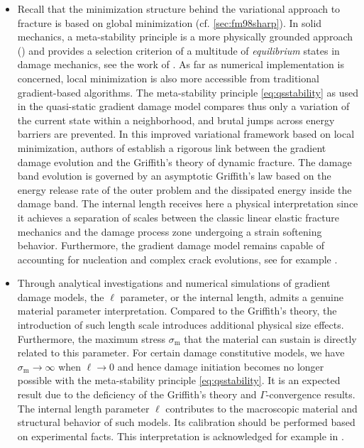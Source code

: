 \begin{itemize}
\item Recall that the minimization structure behind the variational approach to fracture is based on global minimization (cf. \cref{sec:fm98sharp}). In solid mechanics, a meta-stability principle is a more physically grounded approach (\cite{Nguyen:2000}) and provides a selection criterion of a multitude of \emph{equilibrium} states in damage mechanics, see the work of \cite{BenallalMarigo:2007}. As far as numerical implementation is concerned, local minimization is also more accessible from traditional gradient-based algorithms. The meta-stability principle \eqref{eq:qsstability} as used in the quasi-static gradient damage model compares thus only a variation of the current state within a neighborhood, and brutal jumps across energy barriers are prevented. In this improved variational framework based on local minimization, authors of \cite{SicsicMarigo:2013} establish a rigorous link between the gradient damage evolution and the Griffith's theory of dynamic fracture. The damage band evolution is governed by an asymptotic Griffith's law based on the energy release rate of the outer problem and the dissipated energy inside the damage band. The internal length receives here a physical interpretation since it achieves a separation of scales between the classic linear elastic fracture mechanics and the damage process zone undergoing a strain softening behavior. Furthermore, the gradient damage model remains capable of accounting for nucleation and complex crack evolutions, see for example \cite{MauriniBourdinGauthierLazarus:2013,SicsicMarigoMaurini:2013,MesgarnejadBourdinKhonsari:2013,BourdinMarigoMauriniSicsic:2014,Baldelli:2014}. 

\item Through analytical investigations \cite{PhamMarigoMaurini:2011,PhamMarigo:2013} and numerical simulations \cite{AmorMarigoMaurini:2009,PhamAmorMarigoMaurini:2011} of gradient damage models, the $\ell$ parameter, or the internal length, admits a genuine material parameter interpretation. Compared to the Griffith's theory, the introduction of such length scale introduces additional physical size effects. Furthermore, the maximum stress $\sigma_\mathrm{m}$ that the material can sustain is directly related to this parameter. For certain damage constitutive models, we have $\sigma_\mathrm{m}\to\infty$ when $\ell\to 0$ and hence damage initiation becomes no longer possible with the meta-stability principle \eqref{eq:qsstability}. It is an expected result due to the deficiency of the Griffith's theory and $\Gamma$-convergence results. The internal length parameter $\ell$ contributes to the macroscopic material and structural behavior of such models. Its calibration should be performed based on experimental facts. This interpretation is acknowledged for example in \cite{LancioniRoyer-Carfagni:2009,FreddiRoyer-Carfagni:2010,PhamAmorMarigoMaurini:2011}.
\end{itemize}

